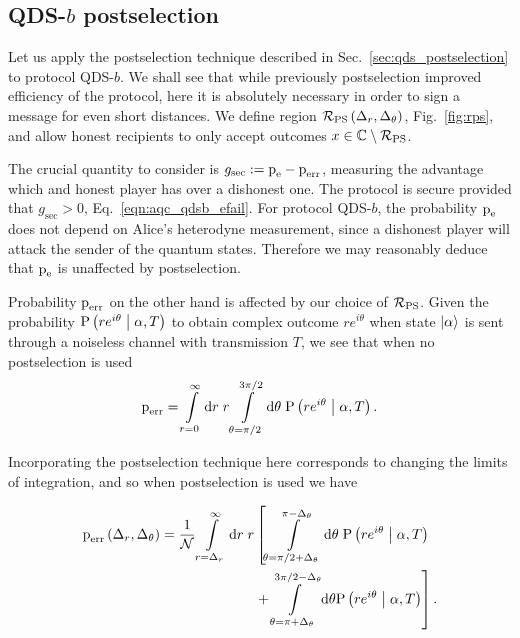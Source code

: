 \subsection{QDS-$b$ postselection}
Let us apply the postselection technique described in Sec.~\ref{sec:qds_postselection} to protocol QDS-$b$. We shall see that while previously postselection improved efficiency of the protocol, here it is absolutely necessary in order to sign a message for even short distances. We define region $\mathcal{R}_{\text{PS}}\left(\Delta_r, \Delta_\theta\right)$, Fig.~\ref{fig:rps}, and allow honest recipients to only accept outcomes $x \in \mathbb{C} \setminus \mathcal{R}_{\text{PS}}$. 

The crucial quantity to consider is $g_{\text{sec}} := \text{p}_{\text{e}} - \text{p}_{\text{err}}$, measuring the advantage which and honest player has over a dishonest one. The protocol is secure provided that $g_{\text{sec}} > 0$, Eq.~\ref{eqn:aqc_qdsb_efail}. For protocol QDS-$b$, the probability $\text{p}_{\text{e}}$ does not depend on Alice's heterodyne measurement, since a dishonest player will attack the sender of the quantum states. Therefore we may reasonably deduce that $\text{p}_{\text{e}}$ is unaffected by postselection.

Probability $\text{p}_{\text{err}}$ on the other hand is affected by our choice of $\mathcal{R}_{\text{PS}}$. Given the probability $\text{P}\left(r e^{i \theta} \; \middle| \; \alpha, T\right)$ to obtain complex outcome $r e^{i \theta}$ when state $\ket{\alpha}$ is sent through a noiseless channel with transmission $T$, we see that when no postselection is used
\begin{equation}
\text{p}_{\text{err}} = \int\limits_{r=0}^\infty \mathrm{d}r \; r \int\limits_{\theta = \pi/2}^{3\pi/2} \mathrm{d}\theta \; \text{P}\left(r e^{i \theta} \; \middle| \; \alpha, T\right).
\end{equation}

\noindent Incorporating the postselection technique here corresponds to changing the limits of integration, and so when postselection is used we have

\begin{align}
\perr\left(\Delta_r, \Delta_\theta\right) = \frac{1}{\mathcal{N}} \int\limits_{r = \Delta_r}^\infty \mathrm{d}r\; r  &\left[ \int\limits_{\theta = \pi/2 + \Delta_\theta}^{\pi - \Delta_\theta} \mathrm{d}\theta \; \text{P}\left(r e^{i \theta} \given \alpha, T\right)\right. \notag \\
%
&\left. + \int\limits_{\theta = \pi + \Delta_\theta}^{3\pi/2 - \Delta_\theta} \mathrm{d}\theta \text{P}\left(r e^{i \theta}\given \alpha, T\right)\right].
\end{align}





